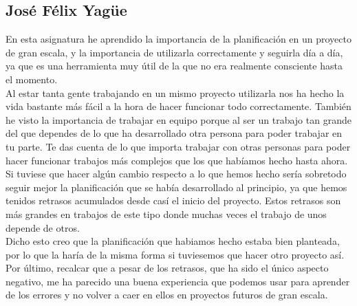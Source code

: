 \documentclass{article}
\begin{document}
\subsection*{José Félix Yagüe}
En esta asignatura he aprendido la importancia de la planificación en un proyecto de gran escala, y la importancia de utilizarla correctamente y seguirla día a día, ya que es una herramienta muy útil de la que no era realmente consciente hasta el momento.\\
\hfill \break
Al estar tanta gente trabajando en un mismo proyecto utilizarla nos ha hecho la vida bastante más fácil a la hora de hacer funcionar todo correctamente.
También he visto la importancia de trabajar en equipo porque al ser un trabajo tan grande del que dependes de lo que ha desarrollado otra persona para poder trabajar en tu parte. Te das cuenta de lo que importa trabajar con otras personas para poder hacer funcionar trabajos más complejos que los que habíamos hecho hasta ahora.\\
\hfill \break
Si tuviese que hacer algún cambio respecto a lo que hemos hecho sería sobretodo seguir mejor la planificación que se había desarrollado al principio, ya que hemos tenidos retrasos acumulados desde casí el inicio del proyecto. Estos retrasos son más grandes en trabajos de este tipo donde muchas veces el trabajo de unos depende de otros.\\
\hfill \break
Dicho esto creo que la planificación que habiamos hecho estaba bien planteada, por lo que la haría de la misma forma si tuviesemos que hacer otro proyecto así.
\newpage
Por último, recalcar que a pesar de los retrasos, que ha sido el único aspecto negativo, me ha parecido una buena experiencia que podemos usar para aprender de los errores y no volver a caer en ellos en proyectos futuros de gran escala.
\end{document}
